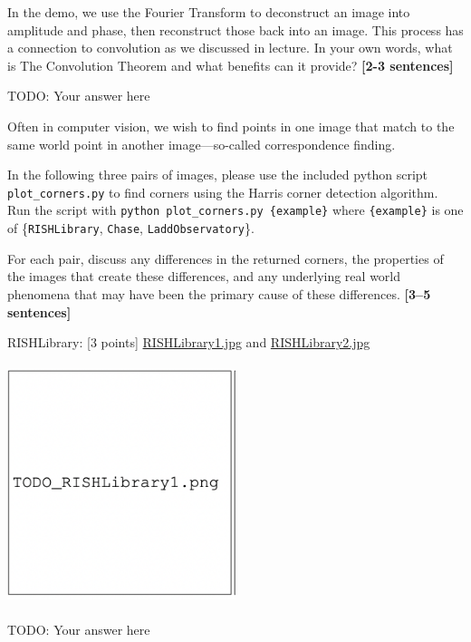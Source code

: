 \documentclass{csci1430}
\begin{document}
\newpage

\begin{subquestion}[points=2]
In the demo, we use the Fourier Transform to deconstruct an image into amplitude and phase, then reconstruct those back into an image. This process has a connection to convolution as we discussed in lecture. In your own words, what is The Convolution Theorem and what benefits can it provide? \textbf{[2-3 sentences]}
\end{subquestion}

\begin{answer}[height=16]
TODO: Your answer here
\end{answer}


\pagebreak


Often in computer vision, we wish to find points in one image that match to the same world point in another image---so-called correspondence finding.

\begin{question}[points=9] 
In the following three pairs of images, please use the included python script \texttt{plot\_corners.py} to find corners using the Harris corner detection algorithm. Run the script with \texttt{python plot\_corners.py \{example\}} where \texttt{\{example\}} is one of \{\texttt{RISHLibrary}, \texttt{Chase}, \texttt{LaddObservatory}\}.

For each pair, discuss any differences in the returned corners, the properties of the images that create these differences, and any underlying real world phenomena that may have been the primary cause of these differences. \textbf{[3--5 sentences]}
\end{question}

RISHLibrary: [3 points]
\href{images/RISHLibrary1.jpg}{RISHLibrary1.jpg} and \href{images/RISHLibrary2.jpg}{RISHLibrary2.jpg} 

\begin{answer}[height=22]
\includegraphics[width=0.5\textwidth,height=7cm,keepaspectratio]{images/TODO_RishLibrary1.png}

TODO: Your answer here
\end{answer}
\end{document}

